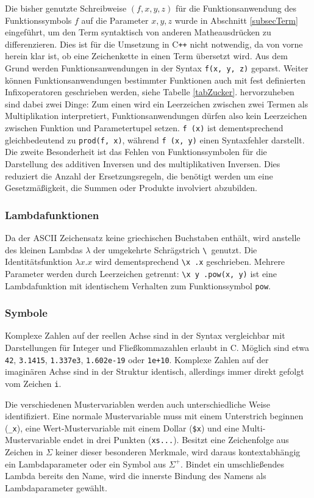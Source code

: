 Die bisher genutzte Schreibweise $(f, x, y, z)$ für die Funktionsanwendung des Funktionssymbols $f$ auf die Parameter $x, y, z$ wurde in Abschnitt \ref{subsecTerm} eingeführt, um den Term syntaktisch von anderen Matheausdrücken zu differenzieren. Dies ist für die Umsetzung in C\texttt{++} nicht notwendig, da von vorne herein klar ist, ob eine Zeichenkette in einen Term übersetzt wird. Aus dem Grund werden Funktionsanwendungen in der Syntax \verb|f(x, y, z)| geparst. Weiter können Funktionsanwendungen bestimmter Funktionen auch mit fest definierten Infixoperatoren geschrieben werden, siehe Tabelle \ref{tabZucker}. hervorzuheben sind dabei zwei Dinge: Zum einen wird ein Leerzeichen zwischen zwei Termen als Multiplikation interpretiert, Funktionsanwendungen dürfen also kein Leerzeichen zwischen Funktion und Parametertupel setzen. \verb|f (x)| ist dementsprechend gleichbedeutend zu \verb|prod(f, x)|, während \verb|f (x, y)| einen Syntaxfehler darstellt. Die zweite Besonderheit ist das Fehlen von Funktionssymbolen für die Darstellung des additiven Inversen und des multiplikativen Inversen. Dies reduziert die Anzahl der Ersetzungsregeln, die benötigt werden um eine Gesetzmäßigkeit, die Summen oder Produkte involviert abzubilden. 

\subsubsection{Lambdafunktionen}
Da der ASCII Zeichensatz keine griechischen Buchstaben enthält, wird anstelle des kleinen Lambdas $\lambda$ der umgekehrte Schrägstrich \verb~\ ~genutzt. Die Identitätsfunktion $\lambda x.x$ wird dementsprechend \verb~\x .x~ geschrieben. Mehrere Parameter werden durch Leerzeichen getrennt: \verb~\x y .pow(x, y)~ ist eine Lambdafunktion mit identischem Verhalten zum Funktionssymbol \verb|pow|.

\subsubsection{Symbole}
Komplexe Zahlen auf der reellen Achse sind in der Syntax vergleichbar mit Darstellungen für Integer und Fließkommazahlen erlaubt in C. Möglich sind etwa \verb|42|, \verb|3.1415|, \verb|1.337e3|, \verb|1.602e-19| oder \verb|1e+10|. Komplexe Zahlen auf der imaginären Achse sind in der Struktur identisch, allerdings immer direkt gefolgt vom Zeichen \verb|i|. 

Die verschiedenen Mustervariablen werden auch unterschiedliche Weise identifiziert. Eine normale Mustervariable muss mit einem Unterstrich beginnen (\verb|_x|), eine Wert-Mustervariable mit einem Dollar (\verb|$x|) und eine Multi-Mustervariable endet in drei Punkten (\verb|xs...|). Besitzt eine Zeichenfolge aus Zeichen in $\Sigma$ keiner dieser besonderen Merkmale, wird daraus kontextabhängig ein Lambdaparameter oder ein Symbol aus $\Sigma^+$. Bindet ein umschließendes Lambda bereits den Name, wird die innerste Bindung des Namens als Lambdaparameter gewählt. 



